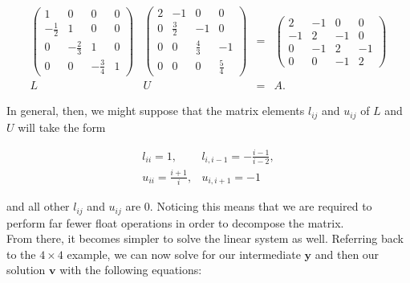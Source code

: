 \documentclass[12pt]{article}
\numberwithin{equation}{section}
\begin{document}
\begin{equation}
\begin{array}{cccc}
\left(\begin{array}{cccc}
1 & 0 & 0 & 0 \\
-\frac{1}{2} & 1 & 0 & 0 \\
0 & -\frac{2}{3} & 1 & 0 \\
0 & 0 & -\frac{3}{4} & 1 
\end{array}\right) &
\left(\begin{array}{cccc}
2 & -1 & 0 & 0 \\
0 & \frac{3}{2} & -1 & 0 \\
0 & 0 & \frac{4}{3} & -1 \\
0 & 0 & 0 & \frac{5}{4} 
\end{array}\right) &=&
\left(\begin{array}{cccc}
2 & -1 & 0 & 0 \\
-1 & 2 & -1 & 0 \\
0 & -1 & 2 & -1 \\
0 & 0 & -1 & 2
\end{array}\right) \\
L & U & = & A.
\end{array}
\end{equation}

\noindent In general, then, we might suppose that the matrix elements $l_{ij}$ and $u_{ij}$ of $L$ and $U$ will take the form

\begin{equation}
\label{eq:luspecalg}
\begin{array}{cc}
l_{ii} = 1, & l_{i,i-1} = -\frac{i-1}{i-2}, \\
u_{ii} = \frac{i+1}{i}, & u_{i,i+1}=-1
\end{array}
\end{equation}

\noindent and all other $l_{ij}$ and $u_{ij}$ are 0.  Noticing this means that we are required to perform far fewer float operations in order to decompose the matrix.  
\\\indent From there, it becomes simpler to solve the linear system as well.  Referring back to the $4\times4$ example, we can now solve for our intermediate $\textbf{y}$ and then our solution $\textbf{v}$ with the following equations:
\end{document}
